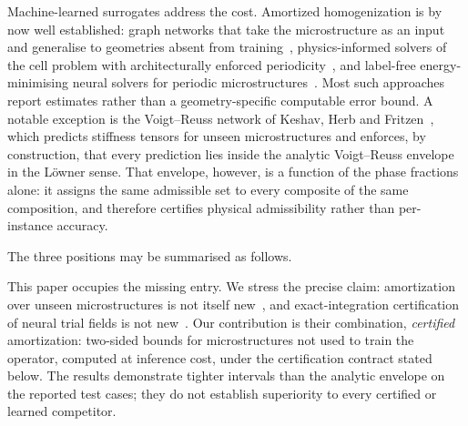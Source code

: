 Machine-learned surrogates address the cost. Amortized homogenization is by
now well established: graph networks that take the microstructure as an
input and generalise to geometries absent from training~\cite{Hendriks2024},
physics-informed solvers of the cell problem with architecturally enforced
periodicity~\cite{Jiang2023}, and label-free energy-minimising neural
solvers for periodic microstructures~\cite{Xing2025}. Most such approaches
report estimates rather than a geometry-specific computable error bound.
A notable exception is the Voigt--Reuss network of Keshav, Herb and
Fritzen~\cite{Keshav2025}, which predicts stiffness tensors
for unseen microstructures and enforces, by construction, that every
prediction lies inside the analytic Voigt--Reuss envelope in the L\"owner
sense. That envelope, however, is a function of the phase fractions alone:
it assigns the same admissible set to every composite of the same
composition, and therefore certifies physical admissibility rather than
per-instance accuracy.

\medskip
The three positions may be summarised as follows.

\begin{center}
\end{center}
\medskip

This paper occupies the missing entry. We stress the precise claim:
amortization over unseen microstructures is not itself new~\cite{Hendriks2024,Jiang2023,Xing2025},
and exact-integration certification of neural trial fields is not
new~\cite{Gaynutdinova2026}. Our contribution is their combination,
\emph{certified} amortization: two-sided bounds for microstructures not
used to train the operator, computed at inference cost, under the
certification contract stated below. The results demonstrate tighter
intervals than the analytic envelope on the reported test cases; they do
not establish superiority to every certified or learned competitor.

